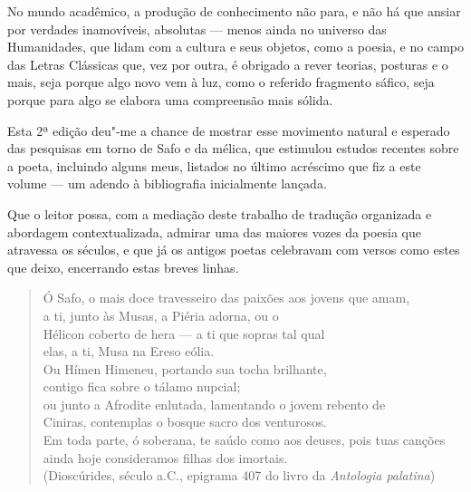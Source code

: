 No mundo acadêmico, a produção de conhecimento não para, e não há que
ansiar por verdades inamovíveis, absolutas --- menos ainda no universo
das Humanidades, que lidam com a cultura e seus objetos, como a poesia,
e no campo das Letras Clássicas que, vez por outra, é obrigado a rever
teorias, posturas e o mais, seja porque algo novo vem à luz, como o referido fragmento sáfico, seja porque para algo se elabora uma compreensão mais
sólida.

Esta 2ª edição deu"-me a chance de mostrar esse movimento natural e
esperado das pesquisas em torno de Safo e da mélica, que estimulou
estudos recentes sobre a poeta, incluindo alguns meus, listados no
último acréscimo que fiz a este volume --- um adendo à bibliografia
inicialmente lançada.

Que o leitor possa, com a mediação deste trabalho de tradução organizada
e abordagem contextualizada, admirar uma das maiores vozes da poesia que
atravessa os séculos, e que já os antigos poetas celebravam com versos
como estes que deixo, encerrando estas breves linhas.

\begin{verse}
Ó Safo, o mais doce travesseiro das paixões \qb{}aos jovens que amam,\\
a ti, junto às Musas, a Piéria adorna, ou o\\
Hélicon coberto de hera --- a ti que sopras tal \qb{}qual\\
elas, a ti, Musa na Ereso eólia.\\
Ou Hímen Himeneu, portando sua tocha \qb{}brilhante,\\
contigo fica sobre o tálamo nupcial;\\
ou junto a Afrodite enlutada, lamentando o \qb{}jovem rebento de\\
Ciniras, contemplas o bosque sacro dos \qb{}venturosos.\\
Em toda parte, ó soberana, te saúdo como aos \qb{}deuses, pois tuas canções\\
ainda hoje consideramos filhas dos imortais.\\[5pt]
(Dioscúrides, século  a.C., epigrama 407 do livro  da
\emph{Antologia palatina})
\end{verse}
